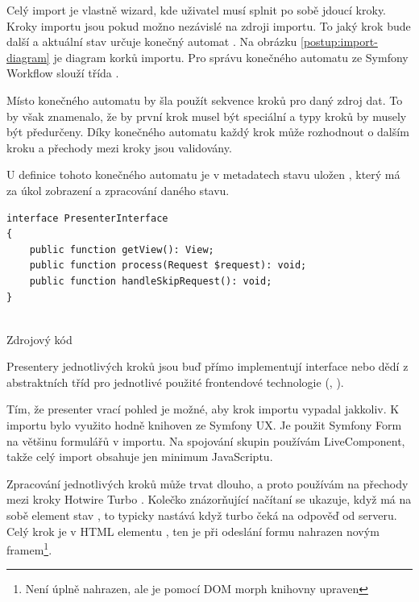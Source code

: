Celý import je vlastně wizard, kde uživatel musí splnit po sobě jdoucí kroky.
Kroky importu jsou pokud možno nezávislé na zdroji importu. 
To jaký krok bude další a aktuální stav určuje konečný automat .
Na obrázku \ref{postup:import-diagram} je diagram korků importu.
Pro správu konečného automatu ze Symfony Workflow slouží třída .

Místo konečného automatu by šla použít sekvence kroků pro daný zdroj dat.
To by však znamenalo, že by první krok musel být speciální a typy kroků by musely být předurčeny.
Díky konečného automatu každý krok může rozhodnout o dalším kroku a přechody mezi kroky jsou validovány.

U definice tohoto konečného automatu je v metadatech stavu uložen , který má za úkol zobrazení a zpracování daného stavu. 

\begin{code}
  \begin{verbatim}
interface PresenterInterface
{
    public function getView(): View;
    public function process(Request $request): void;
    public function handleSkipRequest(): void;
}
 
    \end{verbatim}
    \caption{Zdrojový kód }

\end{code}


Presentery jednotlivých kroků jsou buď přímo implementují interface nebo dědí z abstraktních tříd
pro jednotlivé použité frontendové technologie (, ).

Tím, že presenter vrací pohled je možné, aby krok importu vypadal jakkoliv.
K importu bylo využito hodně knihoven ze Symfony UX.
Je použit Symfony Form na většinu formulářů v importu.
Na spojování skupin používám LiveComponent, takže celý import obsahuje jen minimum JavaScriptu.

Zpracování jednotlivých kroků může trvat dlouho, a proto používám na přechody mezi kroky Hotwire Turbo .
Kolečko znázorňující načítaní se ukazuje, když má na sobě element  stav , to typicky nastává když turbo čeká na odpověď od serveru.
Celý krok je v HTML elementu , ten je při odeslání formu nahrazen novým framem\footnote{Není úplně nahrazen, ale je pomocí DOM morph knihovny upraven}.


